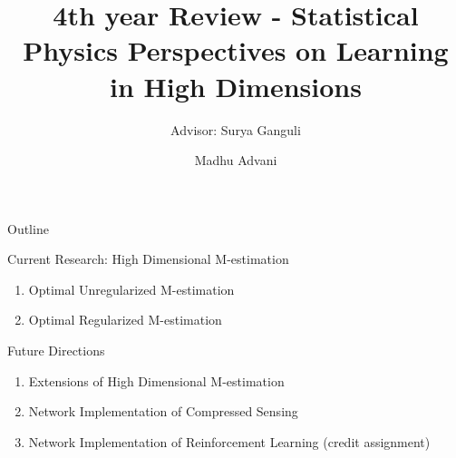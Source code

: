\documentclass[pdf]{beamer}
\title[Physics of Learning]{4th year Review - Statistical Physics Perspectives on Learning in High Dimensions}
\subtitle{Advisor: Surya Ganguli}
\author{Madhu Advani}
\institute{Stanford University}
\begin{document}
\begin{frame}
    \titlepage
\end{frame}

\begin{frame}{Outline}
\begin{block}{Current Research: High Dimensional M-estimation}
\begin{enumerate}
\vspace{.1in}
\item Optimal Unregularized M-estimation
\vspace{.1in}
\item Optimal Regularized M-estimation
\end{enumerate}
\end{block}

\vspace{.1in}
\begin{block}{Future Directions}
    \begin{enumerate}
    \vspace{.1in}
        \item Extensions of High Dimensional M-estimation
        \vspace{.1in}
        \vspace{.1in}
        \item Network Implementation of Compressed Sensing
        \vspace{.1in}
        \item Network Implementation of Reinforcement Learning (credit assignment)
    \end{enumerate}
\end{block}
\end{frame}
\end{document}
